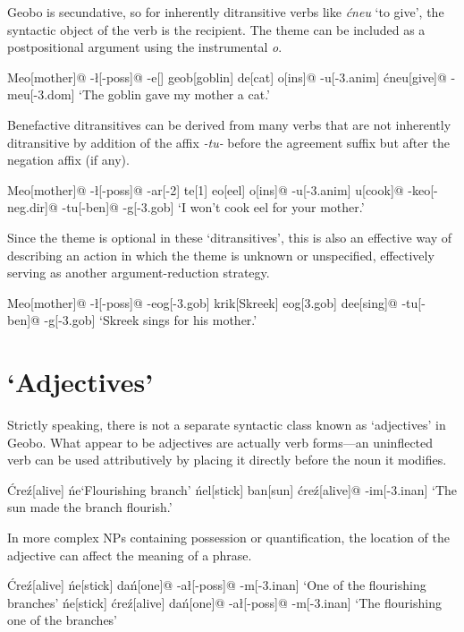\documentclass[a4paper,11pt,oneside,openany]{memoir}
\begin{document}
Geobo{\engma} is secundative, so for inherently ditransitive verbs like \textit{\'cneu} `to give', the syntactic object of the verb is the recipient. The theme can be included as a postpositional argument using the instrumental \textit{\vc o}.

\ex
\begingl
Meo[mother]@
-\l[\sc -poss]@
-e{\vd}[]
geob[goblin]
de{\vz}[cat]
\vc o[\sc ins]@
-\vs u[\sc -3.anim]
\'cneu[give]@
-meu[\sc -3.dom]
\glft `The goblin gave my mother a cat.'
\endgl
\xe

Benefactive ditransitives can be derived from many verbs that are not inherently ditransitive by addition of the affix \textit{-tu-} before the agreement suffix but after the negation affix (if any).

\ex
\begingl
Meo[mother]@
-\l[\sc -poss]@
-ar[-2]
te{\vd}[1]
\vs\vr eo{\vd}[eel]
\vc o[\sc ins]@
-\vs u[\sc -3.anim] 
\vr u[cook]@
-keo[-{\sc neg.dir}]@
-tu[-{\sc ben}]@
-g[-{\sc 3.gob}]
\glft `I won't cook eel for your mother.'
\endgl
\xe

Since the theme is optional in these `ditransitives', this is also an effective way of describing an action in which the theme is unknown or unspecified, effectively serving as another argument-reduction strategy.

\ex
\begingl
Meo[mother]@
-\l[\sc -poss]@
-eog[\sc -3.gob]
\vS krik[Skreek]
eog[\sc 3.gob]
de\vn\vr e[sing]@
-tu[\sc -ben]@
-g[\sc -3.gob]
\glft `Skreek sings for his mother.'
\endgl
\xe

\section{`Adjectives'}

Strictly speaking, there is not a separate syntactic class known as `adjectives' in Geobo{\engma}. What appear to be adjectives are actually verb forms---an uninflected verb can be used attributively by placing it directly before the noun it modifies.

\pex
\a
\begingl
\'Cre\'z[alive]
\vt\'ne\vl[stick]
\glft  `Flourishing branch'
\endgl
\a 
\begingl
\vT\'nel[stick]
ban[sun]
\'cre\'z[alive]@
-im[\sc -3.inan]
\glft `The sun made the branch flourish.'
\endgl
\xe

In more complex NPs containing possession or quantification, the location of the adjective can affect the meaning of a phrase.

\pex
\a
\begingl
\'Cre\'z[alive]
\vt\'ne{\vl}[stick]
da\'n[one]@
-a\l[-{\sc poss}]@
-m[-{\sc 3.inan}]
\glft  `One of the flourishing branches'
\endgl
\a
\begingl
\vT\'ne{\vl}[stick]
\'cre\'z[alive]
da\'n[one]@
-a\l[-{\sc poss}]@
-m[-{\sc 3.inan}]
\glft  `The flourishing one of the branches'
\endgl
\xe
\end{document}
